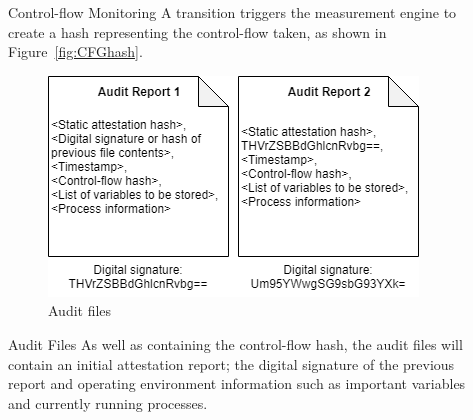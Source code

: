 \documentclass[final]{beamer}
\newlength{\sepwid}
\newlength{\onecolwid}
\newlength{\twocolwid}
\begin{document}
\begin{frame}[t]
\begin{columns}[t]
\begin{column}{\twocolwid}
\begin{columns}[t,totalwidth=\twocolwid]
\begin{column}{\onecolwid}
\begin{block}{Control-flow Monitoring}
A transition triggers the measurement engine to create a hash representing the control-flow taken, as shown in Figure~\ref{fig:CFGhash}.
\end{block}

\begin{figure}
\includegraphics[width=\linewidth]{images/Files.png}
\caption{Audit files}
\vspace{-1cm}
\end{figure}

\begin{block}{Audit Files}
As well as containing the control-flow hash, the audit files will contain an initial attestation report; the digital signature of the previous report and operating environment information such as important variables and currently running processes.

\end{block}

\end{column} %

\end{columns} %

\end{column} %


\begin{column}{\sepwid}\end{column} %

\begin{column}{\onecolwid} %


\end{column}
\end{columns}
\end{frame}
\end{document}
